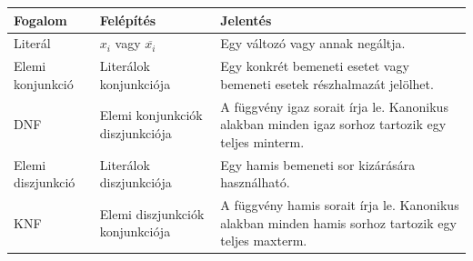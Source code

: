 \begin{tabularx}{\textwidth}{L{28mm}L{35mm}X}
\toprule
\textbf{Fogalom} & \textbf{Felépítés} & \textbf{Jelentés} \\
\midrule
Literál & $x_i$ vagy $\overline{x_i}$ & Egy változó vagy annak negáltja. \\
Elemi konjunkció & Literálok konjunkciója & Egy konkrét bemeneti esetet vagy bemeneti esetek részhalmazát jelölhet. \\
DNF & Elemi konjunkciók diszjunkciója & A függvény igaz sorait írja le. Kanonikus alakban minden igaz sorhoz tartozik egy teljes minterm. \\
Elemi diszjunkció & Literálok diszjunkciója & Egy hamis bemeneti sor kizárására használható. \\
KNF & Elemi diszjunkciók konjunkciója & A függvény hamis sorait írja le. Kanonikus alakban minden hamis sorhoz tartozik egy teljes maxterm. \\
\bottomrule
\end{tabularx}

